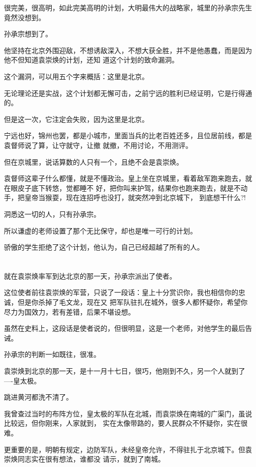 \documentclass[11pt,a4paper,onecolumn]{article}
\begin{document}
很完美，很高明，如此完美高明的计划，大明最伟大的战略家，城里的孙承宗先生竟然没想到。

孙承宗想到了。

他坚持在北京外围迎敌，不想诱敌深入，不想大获全胜，并不是他愚蠢，而是因为他不但知道袁崇焕的计划，还知
道这个计划的致命漏洞。

这个漏洞，可以用五个字来概括：这里是北京。

无论理论还是实战，这个计划都无懈可击，之前宁远的胜利已经证明，它是行得通的。

但是这一次，它注定会失败，因为这里是北京。

宁远也好，锦州也罢，都是小城市，里面当兵的比老百姓还多，且位居前线，都是袁督师说了算，让守就守，让撤
就撤，不用讨论，不用测评。

但在京城里，说话算数的人只有一个，且绝不会是袁崇焕。

袁督师这辈子什么都懂，就是不懂政治。皇上坐在京城里，看着敌军跑来跑去，就在眼皮子底下转悠，觉都睡不
好，把你叫来护驾，结果你也跑来跑去，就是不动手，把皇帝当猴耍，现在连招呼也没打，就突然冲到北京城下，
到底想干什么?!

洞悉这一切的人，只有孙承宗。

所以谦虚的老师设置了那个无比保守，却也是唯一可行的计划。

骄傲的学生拒绝了这个计划，他认为，自己已经超越了所有的人。

\section[\thesection]{}

就在袁崇焕率军到达北京的那一天，孙承宗派出了使者。

这位使者前往袁崇焕的军营，只说了一段话：皇上十分赏识你，我也相信你的忠诚，但是你杀掉了毛文龙，现在又
把军队驻扎在城外，很多人都怀疑你，希望你尽力为国效力，若有差错，后果不堪设想。

虽然在史料上，这段话是使者说的，但很明显，这是一个老师，对他学生的最后告诫。

孙承宗的判断一如既往，很准。

袁崇焕到北京的那一天，是十一月十七日，很巧，他刚到不久，另一个人就到了----皇太极。

跳进黄河都洗不清了。

我曾查过当时的布阵方位，皇太极的军队在北城，而袁崇焕在南城的广渠门，虽说比较远，但你刚来，人家就到，
实在太像带路的，要人民群众不怀疑你，实在很难。

更重要的是，明朝有规定，边防军队，未经皇帝允许，不得驻扎于北京城下。但袁崇焕同志实在很有想法，谁都没
请示，就到了南城。
\end{document}
